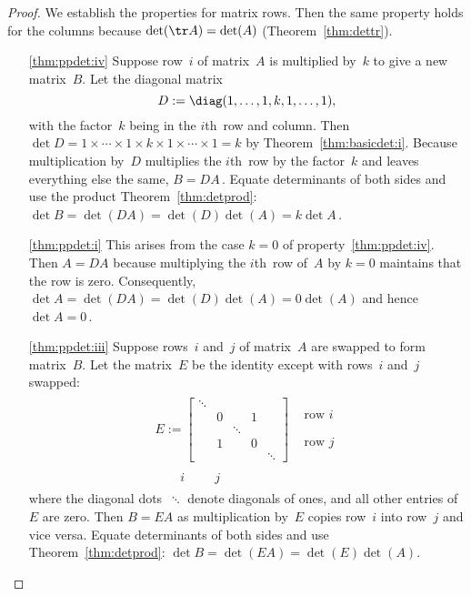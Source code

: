 \begin{proof} 
We establish the  properties for matrix rows.  
Then the same property holds for the columns because \(\det(\tr A)=\det(A)\) (Theorem~\ref{thm:dettr}).
\begin{itemize}
\item[\ref{thm:ppdet:iv}]
Suppose row~\(i\) of matrix~\(A\) is multiplied by~\(k\) to give a new matrix~\(B\).
Let the diagonal matrix
\begin{equation*}
D:=\diag(1,\ldots,1,k,1,\ldots,1),
\end{equation*}
with the factor~\(k\) being in the \(i\)th~row and column.
Then \(\det D=1\times\cdots\times1\times k\times1\times\cdots\times1=k\)  by Theorem~\ref{thm:basicdet:i}.
Because multiplication by~\(D\) multiplies the \(i\)th~row by the factor~\(k\) and leaves everything else the same,  \(B=DA\)\,.
Equate determinants of both sides and use the product Theorem~\ref{thm:detprod}: \(\det B=\det(DA)=\det(D)\det(A)=k\det A\)\,.


\item[\ref{thm:ppdet:i}]
This arises from the case \(k=0\) of property~\ref{thm:ppdet:iv}.
Then \(A=DA\) because multiplying the \(i\)th~row of~\(A\) by \(k=0\) maintains that the row is zero.
Consequently, \(\det A=\det(DA)=\det(D)\det(A)=0\det(A)\) and hence \(\det A=0\)\,.

\item[\ref{thm:ppdet:iii}]
Suppose rows~\(i\) and~\(j\) of matrix~\(A\) are swapped to form matrix~\(B\).
Let the matrix~\(E\) be the identity except with rows~\(i\) and~\(j\) swapped:
\begin{equation*}
\begin{array}{rl}
E:=\begin{bmatrix} 
\ddots
\\&0&&1
\\&&\ddots
\\&1&&0
\\&&&&\ddots \end{bmatrix}&
\begin{matrix} \phantom{\vdots}
\\\text{row }i \\\phantom{\vdots}
\\\text{row }j \\\phantom{\vdots} \end{matrix}
\\
\begin{matrix}\phantom{\cdots}&i&\phantom{\cdots}&j&\phantom{\cdots}  \end{matrix}\quad&
\end{array}
\end{equation*}
where the diagonal dots~\(\ddots\) denote diagonals of ones, and all other entries of~\(E\) are zero.
Then \(B=EA\) as multiplication by~\(E\) copies row~\(i\) into row~\(j\) and vice versa.
Equate determinants of both sides and use Theorem~\ref{thm:detprod}: \(\det B=\det(EA)=\det(E)\det(A)\).


\end{itemize}
\end{proof}
